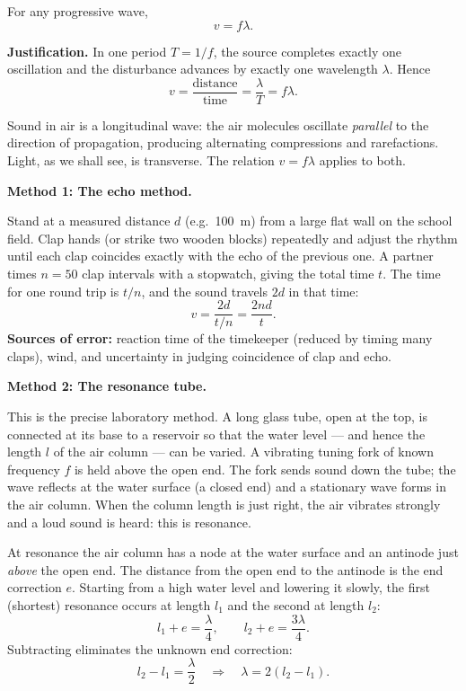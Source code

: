 \documentclass[11pt]{article}
\newcommand{\cle}[1]{{\popxbold\color{popdark}#1}}
\newcounter{popsec}
\newcounter{popsub}
\newcommand{\courssub}[1]{%
  \stepcounter{popsub}%
  \par\vspace{9pt}\noindent{\popxbold\fontsize{11.5}{13}\selectfont\color{popink}{\color{poporange}\thepopsec.\thepopsub}\hspace{6pt}#1}\par\nopagebreak\vspace{4pt}
}
\begin{document}
\begin{propriete}
For any progressive wave,
\[ v = f\lambda. \]
\end{propriete}

\textbf{Justification.} In one period $T = 1/f$, the source completes exactly one oscillation and the disturbance advances by exactly one wavelength $\lambda$. Hence
\[ v = \frac{\text{distance}}{\text{time}} = \frac{\lambda}{T} = f\lambda. \]

Sound in air is a \cle{longitudinal} wave: the air molecules oscillate \emph{parallel} to the direction of propagation, producing alternating compressions and rarefactions. Light, as we shall see, is \cle{transverse}. The relation $v = f\lambda$ applies to both.

\courssub{Measuring the Speed of Sound in Air}

\textbf{Method 1: The echo method.}

\begin{experience}
Stand at a measured distance $d$ (e.g.\ \SI{100}{m}) from a large flat wall on the school field. Clap hands (or strike two wooden blocks) repeatedly and adjust the rhythm until each clap coincides exactly with the echo of the previous one. A partner times $n = 50$ clap intervals with a stopwatch, giving the total time $t$. The time for one round trip is $t/n$, and the sound travels $2d$ in that time:
\[ v = \frac{2d}{t/n} = \frac{2nd}{t}. \]
\textbf{Sources of error:} reaction time of the timekeeper (reduced by timing many claps), wind, and uncertainty in judging coincidence of clap and echo.
\end{experience}

\textbf{Method 2: The resonance tube.}

This is the precise laboratory method. A long glass tube, open at the top, is connected at its base to a reservoir so that the water level --- and hence the length $l$ of the air column --- can be varied. A vibrating tuning fork of known frequency $f$ is held above the open end. The fork sends sound down the tube; the wave reflects at the water surface (a closed end) and a \cle{stationary wave} forms in the air column. When the column length is just right, the air vibrates strongly and a loud sound is heard: this is \cle{resonance}.

At resonance the air column has a node at the water surface and an antinode just \emph{above} the open end. The distance from the open end to the antinode is the \cle{end correction} $e$. Starting from a high water level and lowering it slowly, the first (shortest) resonance occurs at length $l_1$ and the second at length $l_2$:
\[ l_1 + e = \frac{\lambda}{4}, \qquad l_2 + e = \frac{3\lambda}{4}. \]
Subtracting eliminates the unknown end correction:
\[ l_2 - l_1 = \frac{\lambda}{2} \quad\Longrightarrow\quad \lambda = 2(l_2 - l_1). \]
\end{document}
